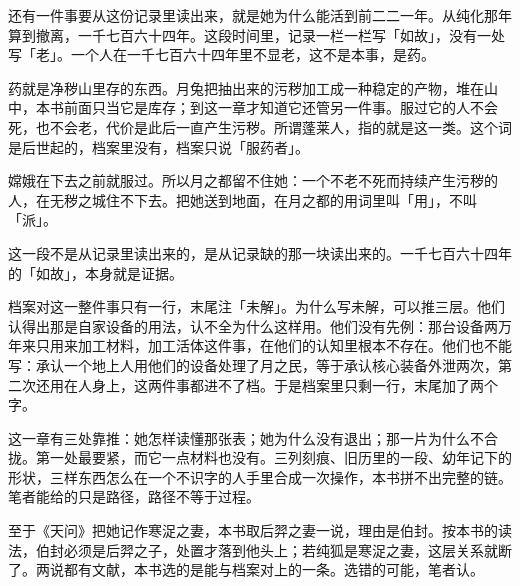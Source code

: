 还有一件事要从这份记录里读出来，就是她为什么能活到前二二一年。从纯化那年算到撤离，一千七百六十四年。这段时间里，记录一栏一栏写「如故」，没有一处写「老」。一个人在一千七百六十四年里不显老，这不是本事，是药。

药就是净秽山里存的东西。月兔把抽出来的污秽加工成一种稳定的产物，堆在山中，本书前面只当它是库存；到这一章才知道它还管另一件事。服过它的人不会死，也不会老，代价是此后一直产生污秽。所谓蓬莱人，指的就是这一类。这个词是后世起的，档案里没有，档案只说「服药者」。

嫦娥在下去之前就服过。所以月之都留不住她：一个不老不死而持续产生污秽的人，在无秽之城住不下去。把她送到地面，在月之都的用词里叫「用」，不叫「派」。

这一段不是从记录里读出来的，是从记录缺的那一块读出来的。一千七百六十四年的「如故」，本身就是证据。

档案对这一整件事只有一行，末尾注「未解」。为什么写未解，可以推三层。他们认得出那是自家设备的用法，认不全为什么这样用。他们没有先例：那台设备两万年来只用来加工材料，加工活体这件事，在他们的认知里根本不存在。他们也不能写：承认一个地上人用他们的设备处理了月之民，等于承认核心装备外泄两次，第二次还用在人身上，这两件事都进不了档。于是档案里只剩一行，末尾加了两个字。

这一章有三处靠推：她怎样读懂那张表；她为什么没有退出；那一片为什么不合拢。第一处最要紧，而它一点材料也没有。三列刻痕、旧历里的一段、幼年记下的形状，三样东西怎么在一个不识字的人手里合成一次操作，本书拼不出完整的链。笔者能给的只是路径，路径不等于过程。

至于《天问》把她记作寒浞之妻，本书取后羿之妻一说，理由是伯封。按本书的读法，伯封必须是后羿之子，处置才落到他头上；若纯狐是寒浞之妻，这层关系就断了。两说都有文献，本书选的是能与档案对上的一条。选错的可能，笔者认。
